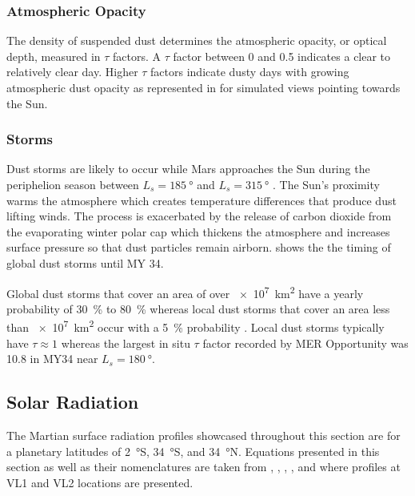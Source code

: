 \subsubsection{Atmospheric Opacity}
\label{sec:MartianEnvironment:Dust:AtmosphericOpacity}
The density of suspended dust determines the atmospheric opacity, or optical depth, measured in $\tau$ factors. A $\tau$ factor between 0 and 0.5 indicates a clear to relatively clear day. Higher $\tau$ factors indicate dusty days with growing atmospheric dust opacity as represented in  for simulated views pointing towards the Sun. %

\subsubsection{Storms}
\label{sec:MartianEnvironment:Dust:Storms}

Dust storms are likely to occur while Mars approaches the Sun during the periphelion season between $L_{s} = \SI{185}{\degree}$ and $L_{s} = \SI{315}{\degree}$ . The Sun's proximity warms the atmosphere which creates temperature differences that produce dust lifting winds. The process is exacerbated by the release of carbon dioxide from the evaporating winter polar cap which thickens the atmosphere and increases surface pressure so that dust particles remain airborn.  shows the the timing of global dust storms until \ac{MY} 34.

Global dust storms that cover an area of over \SI{e7}{\kilo\meter\squared} have a yearly probability of \SI{30}{\percent} to \SI{80}{\percent} whereas local dust storms that cover an area less than \SI{e7}{\kilo\meter\squared} occur with a \SI{5}{\percent} probability . Local dust storms typically have $\tau \approx 1$  whereas the largest in situ $\tau$ factor recorded by \ac{MER} Opportunity was 10.8 in \ac{MY}34 near $L_{s} = \SI{180}{\degree}$.

\subsection{Solar Radiation}
\label{sec:MartianEnvironment:SolarRadiation}

The Martian surface radiation profiles showcased throughout this section are for a planetary latitudes of \SI{2}{\degree}S, \SI{34}{\degree}S, and \SI{34}{\degree}N. Equations presented in this section as well as their nomenclatures are taken from , , , , and  where profiles at \ac{VL1} and \ac{VL2} locations are presented.


